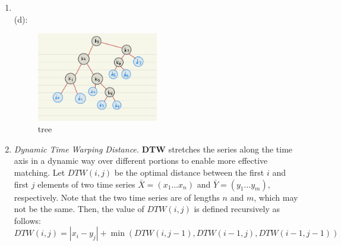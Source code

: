 \documentclass[12pt,a4paper]{article}
\makeatletter
\newtheorem*{solution}{Solution}
\theoremstyle{definition}
\renewenvironment{solution}[1][Solution] {\par\pushQED{\qed}\normalfont\topsep6\p@\@plus6\p@\relax\trivlist\item[\hskip\labelsep\bfseries#1\@addpunct{.}]\ignorespaces}{\popQED\endtrivlist\@endpefalse} \makeatother
\makeatother
\begin{document}
\begin{enumerate}
\begin{solution}
		        \\(d):\\
		        \begin{figure}[H] %
                \centering %
                \includegraphics[width=0.5\textwidth]{tree.pdf}
                \caption{tree} %
                \label{} %
                \end{figure}
                
		        
		    \end{solution}
		
		
		\item \textit{Dynamic Time Warping Distance.} \textbf{DTW} stretches the series along the time axis in a dynamic way over different
		portions to enable more effective matching. Let $D T W(i, j)$ be the optimal distance between the first $i$ and first $j$ elements of two time series $\bar{X}=\left(x_{1} \ldots x_{n}\right)$ and $\bar{Y}=\left(y_{1} \ldots y_{m}\right),$ respectively. Note that the two time series are of lengths $n$ and $m$, which may not be the same. Then, the value of $D T W(i, j)$ is defined recursively as follows:
		$$
		DTW(i, j)=\left|x_{i}- y_{j}\right|+\min(DTW(i, j-1), DTW(i-1, j), DTW(i-1, j-1))
		$$
		

\end{enumerate}
\end{document}
